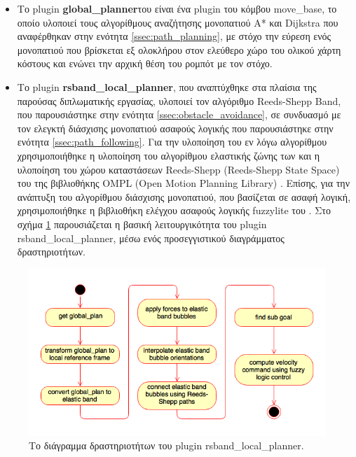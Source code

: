\begin{itemize}
	\item Το plugin \textbf{global{\_}planner}του \citeauthor{global_planner} \cite{global_planner} είναι ένα plugin του κόμβου move{\_}base, το οποίο υλοποιεί τους αλγορίθμους αναζήτησης μονοπατιού A* και Dijkstra που αναφέρθηκαν στην ενότητα \ref{ssec:path_planning}, με στόχο την εύρεση ενός μονοπατιού που βρίσκεται εξ ολοκλήρου στον ελεύθερο χώρο του ολικού χάρτη κόστους και ενώνει την αρχική θέση του ρομπότ με τον στόχο.
	\item Το plugin \textbf{rsband{\_}local{\_}planner}, που αναπτύχθηκε στα πλαίσια της παρούσας διπλωματικής εργασίας, υλοποιεί τον αλγόριθμο Reeds-Shepp Band, που παρουσιάστηκε στην ενότητα \ref{ssec:obstacle_avoidance}, σε συνδυασμό με τον ελεγκτή διάσχισης μονοπατιού ασαφούς λογικής που παρουσιάστηκε στην ενότητα \ref{ssec:path_following}. Για την υλοποίηση του εν λόγω αλγορίθμου χρησιμοποιήθηκε η υλοποίηση του αλγορίθμου ελαστικής ζώνης των \citeauthor{eband_local_planner} \cite{eband_local_planner} και η υλοποίηση του χώρου καταστάσεων Reeds-Shepp (Reeds-Shepp State Space) του \citeauthor{reeds_shepp_ompl} \cite{reeds_shepp_ompl} της βιβλιοθήκης OMPL (Open Motion Planning Library) \cite{ompl}. Επίσης, για την ανάπτυξη του αλγορίθμου διάσχισης μονοπατιού, που βασίζεται σε ασαφή λογική, χρησιμοποιήθηκε η βιβλιοθήκη ελέγχου ασαφούς λογικής fuzzylite \cite{fuzzylite} του \citeauthor{fuzzylite}. Στο σχήμα \ref{fig:rsband_activity_diagram} παρουσιάζεται η βασική λειτουργικότητα του plugin rsband{\_}local{\_}planner, μέσω ενός προσεγγιστικού διαγράμματος δραστηριοτήτων.
\end{itemize}

\begin{figure}[!ht]
	\centering
	\includegraphics[width=0.7\linewidth]{Chapters/Chapter4/Figures/rsband_activity_diagram.png}
	\caption{Το διάγραμμα δραστηριοτήτων του plugin rsband{\_}local{\_}planner.}
	\label{fig:rsband_activity_diagram}
\end{figure}

